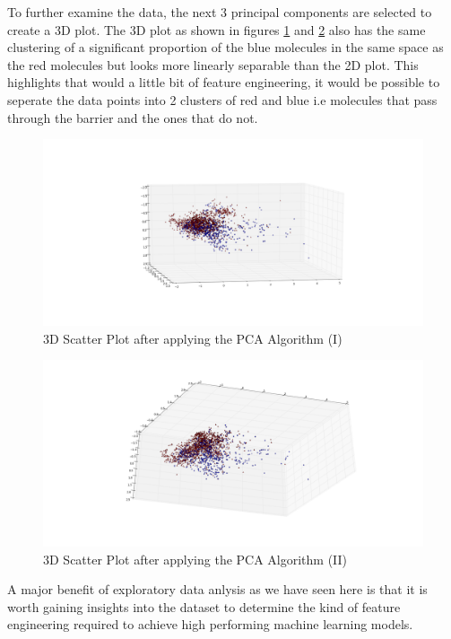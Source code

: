 \documentclass[a4paper,12pt]{report}
\begin{document}
		To further examine the data, the next 3 principal components are selected to create a 3D plot. The 3D plot as shown in figures \ref{fig:scatter_pca_3D} and \ref{fig:scatter_pca_3D_2} also has the same clustering of a significant proportion of the blue molecules in the same space as the red molecules but looks more linearly separable than the 2D plot. This highlights that would a little bit of feature engineering, it would be possible to seperate the data points into 2 clusters of red and blue i.e molecules that pass through the barrier and the ones that do not. 
		\begin{figure}[H]
			\centering
			\includegraphics[width=\textwidth,scale=1,totalheight=0.4\textheight]{images/scatter_pca_3D}
			\caption{3D Scatter Plot after applying the PCA Algorithm (I)}
			\label{fig:scatter_pca_3D}
		\end{figure}
		\begin{figure}[H]
			\centering
			\includegraphics[width=\textwidth,scale=1,totalheight=0.4\textheight]{images/scatter_pca_3D_2}
			\caption{3D Scatter Plot after applying the PCA Algorithm (II)}
			\label{fig:scatter_pca_3D_2}
		\end{figure}
		
		A major benefit of exploratory data anlysis as we have seen here is that it is worth gaining insights into the dataset to determine the kind of feature engineering required to achieve high performing machine learning models.
	
\end{document}
